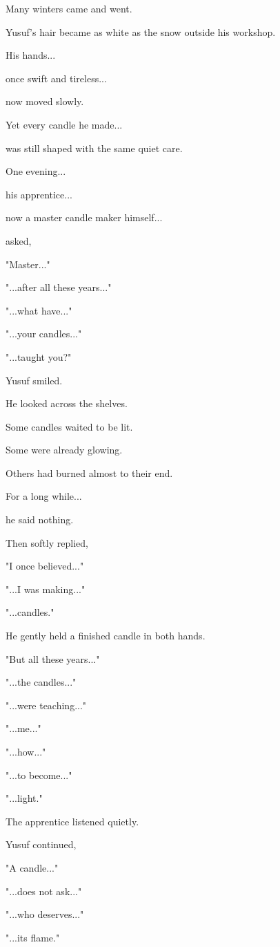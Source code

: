 \documentclass[12pt,openany]{book}
\begin{document}
Many winters came and went.

Yusuf's hair became as white as the snow outside his workshop.

His hands...

once swift and tireless...

now moved slowly.

Yet every candle he made...

was still shaped with the same quiet care.

One evening...

his apprentice...

now a master candle maker himself...

asked,

"Master..."

"...after all these years..."

"...what have..."

"...your candles..."

"...taught you?"

Yusuf smiled.

He looked across the shelves.

Some candles waited to be lit.

Some were already glowing.

Others had burned almost to their end.

For a long while...

he said nothing.

Then softly replied,

"I once believed..."

"...I was making..."

"...candles."

He gently held a finished candle in both hands.

"But all these years..."

"...the candles..."

"...were teaching..."

"...me..."

"...how..."

"...to become..."

"...light."

The apprentice listened quietly.

Yusuf continued,

"A candle..."

"...does not ask..."

"...who deserves..."

"...its flame."
\end{document}

